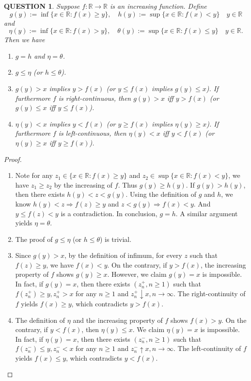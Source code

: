 \documentclass[12pt]{article}
\renewcommand{\(}{\left(}%
\renewcommand{\)}{\right)}%
\renewcommand{\[}{\left[}%
\renewcommand{\]}{\right]}%
\renewcommand{\r}{\mathbb{R}}
\newtheorem{question}{QUESTION}[section]}
\newtheorem{proof}{Proof.}}
\begin{document}
  \begin{question}
  	Suppose $f:\r\to\r$ is an increasing function. Define
  	\begin{equation*}
  		g(y):=\inf\{x\in\r:f(x)\geq y\},\quad h(y):=\sup\{x\in\r:f(x)<y\}  \quad y\in\r
  	\end{equation*}
  	and
  	\begin{equation*}
  		\eta(y):=\inf\{x\in\r:f(x)> y\},\quad \theta(y):=\sup\{x\in\r:f(x)\leq y\}  \quad y\in\r.
  	\end{equation*}
  	Then we have 
  	\begin{enumerate}
  		\item $g=h$ and $\eta=\theta$.
  		\item $g\leq \eta$ (or $h\leq \theta$).
  		\item $g(y)>x$ implies $y>f(x)$ (or $y\leq f(x)$ implies $g(y)\leq x$). If furthermore $f$ is right-continuous, then $g(y)>x$ iff $y>f(x)$ (or $g(y)\leq x$ iff $y\leq f(x)$).
  		\item $\eta(y)< x$ implies $y< f(x)$ (or $y\geq f(x)$ implies $\eta(y)\geq x$). If furthermore $f$ is left-continuous, then $\eta(y)<x$ iff $y<f(x)$ (or $\eta(y)\geq x$ iff $y\geq f(x)$).
  	\end{enumerate}
  \end{question}
  \begin{proof}
  	\begin{enumerate}
  		\item Note for any $z_1\in \{x\in\r:f(x)\geq y\}$ and $z_2\in \sup\{x\in\r:f(x)<y\}$, we have $z_1\geq z_2$ by the increasing of $f$. Thus $g(y)\geq h(y)$. If $g(y)>h(y)$, then there exists $h(y)<z<g(y)$. Using the definition of $g$ and $h$, we know $h(y)<z\Longrightarrow f(z)\geq y$ and $z<g(y)\Longrightarrow f(x)<y$. And $y\leq f(z)<y$ is a contradiction. In conclusion, $g=h$. A similar argument yields $\eta=\theta$.
  		\item The proof of $g\leq \eta$ (or $h\leq \theta$) is trivial.
  		\item Since $g(y)>x$, by the definition of infimum, for every $z$ such that $f(z)\geq y$, we have $f(x)<y$. On the contrary, if $y>f(x)$, the increasing property of $f$ shows $g(y)\geq x$. However, we claim $g(y)=x$ is impossible. In fact, if $g(y)=x$, then there exists $(z_n^+,n\geq 1)$ such that $f(z_n^+)\geq y,z_n^+>x$ for any $n\geq 1$ and $z_n^+\downarrow x,n\to\infty$. The right-continuity of $f$ yields $f(x)\geq y$, which contradicts $y>f(x)$.
  		\item The definition of $\eta$ and the increasing property of $f$ shows $f(x)>y$. On the contrary, if $y<f(x)$, then $\eta(y)\leq x$. We claim $\eta(y)=x$ is impossible. In fact, if $\eta(y)=x$, then there exists $(z_n^-,n\geq 1)$ such that $f(z_n^-)\leq y,z_n^-<x$ for any $n\geq 1$ and $z_n^-\uparrow x,n\to\infty$. The left-continuity of $f$ yields $f(x)\leq y$, which contradicts $y<f(x)$.
  	\end{enumerate}
  \end{proof}
  
\end{document}
